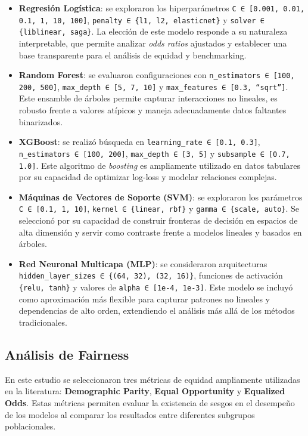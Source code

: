 \documentclass[sjournal]{IEEEtran}
\begin{document}
\begin{itemize}
    \item \textbf{Regresión Logística}: se exploraron los hiperparámetros \verb|C ∈ [0.001, 0.01, 0.1, 1, 10, 100]|, \verb|penalty ∈ {l1, l2, elasticnet}| y \verb|solver ∈ {liblinear, saga}|. La elección de este modelo responde a su naturaleza interpretable, que permite analizar \textit{odds ratios} ajustados y establecer una base transparente para el análisis de equidad y benchmarking.
    \item \textbf{Random Forest}: se evaluaron configuraciones con \verb|n_estimators ∈ [100, 200, 500]|, \verb|max_depth ∈ [5, 7, 10]| y \verb|max_features ∈ [0.3, “sqrt”]|. Este ensamble de árboles permite capturar interacciones no lineales, es robusto frente a valores atípicos y maneja adecuadamente datos faltantes binarizados.
    \item \textbf{XGBoost}: se realizó búsqueda en \verb|learning_rate ∈ [0.1, 0.3]|, \verb|n_estimators ∈ [100, 200]|, \verb|max_depth ∈ [3, 5]| y \verb|subsample ∈ [0.7, 1.0]|. Este algoritmo de \textit{boosting} es ampliamente utilizado en datos tabulares por su capacidad de optimizar log-loss y modelar relaciones complejas.
    \item \textbf{Máquinas de Vectores de Soporte (SVM)}: se exploraron los parámetros \verb|C ∈ [0.1, 1, 10]|, \verb|kernel ∈ {linear, rbf}| y \verb|gamma ∈ {scale, auto}|. Se seleccionó por su capacidad de construir fronteras de decisión en espacios de alta dimensión y servir como contraste frente a modelos lineales y basados en árboles.
    \item \textbf{Red Neuronal Multicapa (MLP)}: se consideraron arquitecturas \verb|hidden_layer_sizes ∈ {(64, 32), (32, 16)}|, funciones de activación \verb|{relu, tanh}| y valores de \verb|alpha ∈ [1e-4, 1e-3]|. Este modelo se incluyó como aproximación más flexible para capturar patrones no lineales y dependencias de alto orden, extendiendo el análisis más allá de los métodos tradicionales.
\end{itemize}


    

\subsection{Análisis de Fairness
}
En este estudio se seleccionaron tres métricas de equidad ampliamente utilizadas en la literatura: \textbf{Demographic Parity}, \textbf{Equal Opportunity} y \textbf{Equalized Odds}. Estas métricas permiten evaluar la existencia de sesgos en el desempeño de los modelos al comparar los resultados entre diferentes subgrupos poblacionales.
\end{document}
